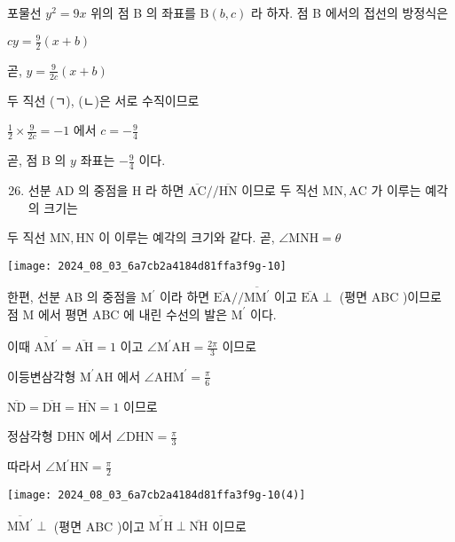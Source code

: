 \documentclass[10pt]{article}
\begin{document}
포물선 \(y^{2}=9 x\) 위의 점 B 의 좌표를 \(\mathrm{B}(b, c)\) 라 하자. 점 B 에서의 접선의 방정식은

\(c y=\frac{9}{2}(x+b)\)

곧, \(y=\frac{9}{2 c}(x+b)\)

두 직선 (ㄱ), (ㄴ)은 서로 수직이므로

\(\frac{1}{2} \times \frac{9}{2 c}=-1\) 에서 \(c=-\frac{9}{4}\)

곧, 점 B 의 \(y\) 좌표는 \(-\frac{9}{4}\) 이다.

\begin{enumerate}
  \setcounter{enumi}{25}
  \item 선분 AD 의 중점을 H 라 하면 \(\overline{\mathrm{AC}} / / \overline{\mathrm{HN}}\) 이므로 두 직선 \(\mathrm{MN}, \mathrm{AC}\) 가 이루는 예각의 크기는
\end{enumerate}

두 직선 \(\mathrm{MN}, \mathrm{HN}\) 이 이루는 예각의 크기와 같다. 곧, \(\angle \mathrm{MNH}=\theta\)

\begin{center}
\texttt{[image: 2024\_08\_03\_6a7cb2a4184d81ffa3f9g-10]}
\end{center}

한편, 선분 AB 의 중점을 \(\mathrm{M}^{\prime}\) 이라 하면 \(\overline{\mathrm{EA}} / / \overline{\mathrm{MM}^{\prime}}\) 이고 \(\overline{\mathrm{EA}} \perp\) (평면 ABC )이므로 점 M 에서 평면 ABC 에 내린 수선의 발은 \(\mathrm{M}^{\prime}\) 이다.

이때 \(\overline{\mathrm{AM}^{\prime}}=\overline{\mathrm{AH}}=1\) 이고 \(\angle \mathrm{M}^{\prime} \mathrm{AH}=\frac{2 \pi}{3}\) 이므로

이등변삼각형 \(\mathrm{M}^{\prime} \mathrm{AH}\) 에서 \(\angle \mathrm{AHM}^{\prime}=\frac{\pi}{6}\)

\(\overline{\mathrm{ND}}=\overline{\mathrm{DH}}=\overline{\mathrm{HN}}=1\) 이므로

정삼각형 DHN 에서 \(\angle \mathrm{DHN}=\frac{\pi}{3}\)

따라서 \(\angle \mathrm{M}^{\prime} \mathrm{HN}=\frac{\pi}{2}\)

\begin{center}
\texttt{[image: 2024\_08\_03\_6a7cb2a4184d81ffa3f9g-10(4)]}
\end{center}

\(\overline{\mathrm{MM}^{\prime}} \perp\) (평면 ABC )이고 \(\overline{\mathrm{M}^{\prime} \mathrm{H}} \perp \overline{\mathrm{NH}}\) 이므로
\end{document}

